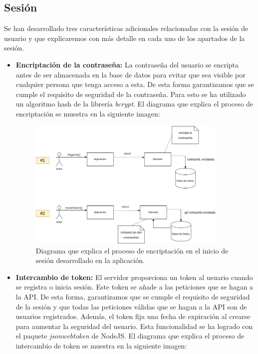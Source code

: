 \subsection{Sesión}
\label{sec:sesion}
Se han desarrollado tres características adicionales relacionadas con la sesión de usuario y que explicaremos con más detalle en cada uno de los apartados de la sesión.
\begin{itemize}
    \item \textbf{Encriptación de la contraseña:} La contraseña del usuario se encripta antes de ser almacenada en la base de datos para evitar que sea visible por cualquier persona que tenga acceso a esta. De esta forma
    garantizamos que se cumple el requisito de seguridad de la contraseña. Para esto se ha utilizado un algoritmo hash de la librería \textit{bcrypt}.
    El diagrama que explica el proceso de encriptación se muestra en la siguiente imagen:
    \begin{figure}[H]
      \centering
      \includegraphics[width=0.9\textwidth]{imagenes/c7/logindiag.png}
      \caption{Diagrama que explica el proceso de encriptación en el inicio de sesión desarrollado en la aplicación.}
      \label{fig:login}
    \end{figure}

    \item \textbf{Intercambio de token:} El servidor proporciona un token al usuario cuando se registra o inicia sesión. Este token se añade a las peticiones que se hagan a la API. De esta forma, garantizamos que se cumple el requisito de seguridad de la sesión y 
    que todas las peticiones válidas que se hagan a la API son de usuarios registrados. Además, el token fija una fecha de expiración al crearse para aumentar la seguridad del usuario. Esta funcionalidad se ha logrado con el paquete \textit{jsonwebtoken} de NodeJS.
    El diagrama que explica el proceso de intercambio de token se muestra en la siguiente imagen:


\end{itemize}
